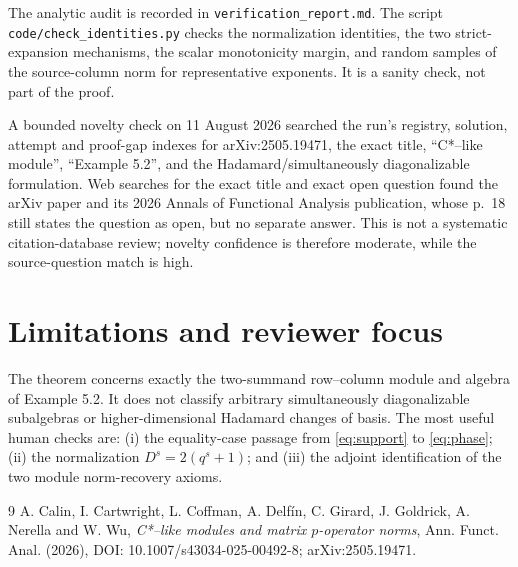 \documentclass[11pt]{article}
\begin{document}
The analytic audit is recorded in \nolinkurl{verification_report.md}.  The
script \nolinkurl{code/check_identities.py} checks the normalization identities,
the two strict-expansion mechanisms, the scalar monotonicity margin, and random
samples of the source-column norm for representative exponents.  It is a
sanity check, not part of the proof.

A bounded novelty check on 11 August 2026 searched the run's registry,
solution, attempt and proof-gap indexes for arXiv:2505.19471, the exact title,
``C*--like module'', ``Example 5.2'', and the Hadamard/simultaneously
diagonalizable formulation.  Web searches for the exact title and exact open
question found the arXiv paper and its 2026 Annals of Functional Analysis
publication, whose p.~18 still states the question as open, but no separate
answer.  This is not a systematic citation-database review; novelty confidence
is therefore moderate, while the source-question match is high.

\section{Limitations and reviewer focus}

The theorem concerns exactly the two-summand row--column module and algebra of
Example 5.2.  It does not classify arbitrary simultaneously diagonalizable
subalgebras or higher-dimensional Hadamard changes of basis.  The most useful
human checks are: (i) the equality-case passage from \eqref{eq:support} to
\eqref{eq:phase}; (ii) the normalization \(D^s=2(q^s+1)\); and (iii) the
adjoint identification of the two module norm-recovery axioms.

\begin{thebibliography}{9}
A. Calin, I. Cartwright, L. Coffman, A. Delf\'in, C. Girard, J. Goldrick,
A. Nerella and W. Wu,
\emph{C*--like modules and matrix \(p\)-operator norms},
Ann. Funct. Anal. (2026), DOI: 10.1007/s43034-025-00492-8;
arXiv:2505.19471.
\end{thebibliography}
\end{document}
